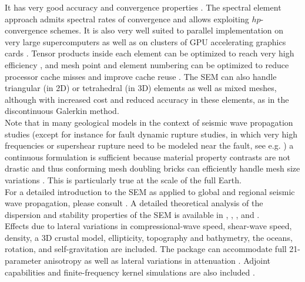 \documentclass[oneside,english]{book}
\begin{document}
It has very good accuracy and convergence properties \citep{MaPa89,SePr94,DeFiMu02,Coh02,DeSe07,SeOl08,AiWa09,AiWa10,MeStTh12}.
The spectral element approach admits spectral rates of convergence and allows exploiting $hp$-convergence schemes.
It is also very well suited to parallel implementation on very large supercomputers \citep{KoTsChTr03,TsKoChTr03,KoLaMi08a,CaKoLaTiMiLeSnTr08,KoViCh10} as well as on clusters of GPU accelerating graphics cards \citep{Kom11,MiKo10,KoMiEr09,KoErGoMi10}. Tensor products inside each element can be optimized to reach very high efficiency \citep{DeFiMu02}, and mesh point and element numbering can be optimized to reduce processor cache misses and improve cache reuse \citep{KoLaMi08a}. The SEM can also handle triangular (in 2D) or tetrahedral (in 3D) elements \citep{WinBoyd96,TaWi00,KoMaTrTaWi01,Coh02,MeViSa06} as well as mixed meshes, although with increased cost and reduced accuracy in these elements, as in the discontinuous Galerkin method.\\

Note that in many geological models in the context of seismic wave propagation studies
(except for instance for fault dynamic rupture studies, in which very high frequencies or supershear rupture need to be modeled near the fault, see e.g. \cite{BeGlCrViPi07,BeGlCrVi09,PuAmKa09,TaCrEtViBeSa10})
a continuous formulation is sufficient because material property contrasts are not drastic and thus
conforming mesh doubling bricks can efficiently handle mesh size variations \citep{KoTr02a,KoLiTrSuStSh04,LeChLiKoHuTr08,LeChKoHuTr09,LeKoHuTr09}.
This is particularly true at the scale of the full Earth.\\

For a detailed introduction to the SEM as applied to
global and regional seismic wave propagation, please consult \citet{TrKoLi08,PeKoLuMaLeCaLeMaLiBlNiBaTr11,KoVi98,KoTr99,Ch00,KoTr02a,KoTr02b,KoRiTr02,ChCaVi03,CaChViMo03,ChVa04,ChKoViCaVaFe07}.
A detailed theoretical analysis of the dispersion
and stability properties of the SEM is available in \citet{Coh02}, \citet{DeSe07}, \citet{SeOl07}, \citet{SeOl08} and \citet{MeStTh12}.\\

Effects due to lateral variations in compressional-wave
speed, shear-wave speed, density, a 3D crustal model, ellipticity,
topography and bathymetry, the oceans, rotation, and self-gravitation are included.
The package can accommodate full 21-parameter anisotropy \citep{ChTr07}
as well as lateral variations in attenuation \citep{SaKoTr10}. Adjoint
capabilities and finite-frequency kernel simulations are also included
\citep{TrKoLi08,PeKoLuMaLeCaLeMaLiBlNiBaTr11,LiTr06,LiTr08,FiIgBuKe09,ViOp09}.\\
\end{document}
